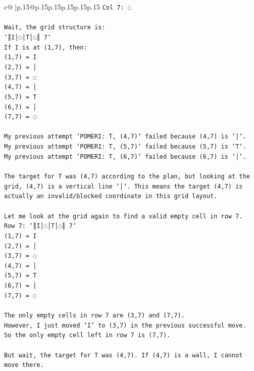 \documentclass{article}
\begin{document}
{\begin{supertabular}{c@{$\;$}|p{.15\linewidth}@{}p{.15\linewidth}p{.15\linewidth}p{.15\linewidth}p{.15\linewidth}p{.15\linewidth}}
{{{\texttt{Col 7: ◌} \\
\\ 
\texttt{Wait, the grid structure is:} \\
\texttt{`║I│◌│T│◌║ 7`} \\
\texttt{If I is at (1,7), then:} \\
\texttt{(1,7) = I} \\
\texttt{(2,7) = │} \\
\texttt{(3,7) = ◌} \\
\texttt{(4,7) = │} \\
\texttt{(5,7) = T} \\
\texttt{(6,7) = │} \\
\texttt{(7,7) = ◌} \\
\\ 
\texttt{My previous attempt `POMERI: T, (4,7)` failed because (4,7) is `│`.} \\
\texttt{My previous attempt `POMERI: T, (5,7)` failed because (5,7) is `T`.} \\
\texttt{My previous attempt `POMERI: T, (6,7)` failed because (6,7) is `│`.} \\
\\ 
\texttt{The target for T was (4,7) according to the plan, but looking at the grid, (4,7) is a vertical line `│`. This means the target (4,7) is actually an invalid/blocked coordinate in this grid layout.} \\
\\ 
\texttt{Let me look at the grid again to find a valid empty cell in row 7.} \\
\texttt{Row 7: `║I│◌│T│◌║ 7`} \\
\texttt{(1,7) = I} \\
\texttt{(2,7) = │} \\
\texttt{(3,7) = ◌} \\
\texttt{(4,7) = │} \\
\texttt{(5,7) = T} \\
\texttt{(6,7) = │} \\
\texttt{(7,7) = ◌} \\
\\ 
\texttt{The only empty cells in row 7 are (3,7) and (7,7).} \\
\texttt{However, I just moved 'I' to (3,7) in the previous successful move.} \\
\texttt{So the only empty cell left in row 7 is (7,7).} \\
\\ 
\texttt{But wait, the target for T was (4,7). If (4,7) is a wall, I cannot move there.} \\
}}}
\end{supertabular}}
\end{document}
